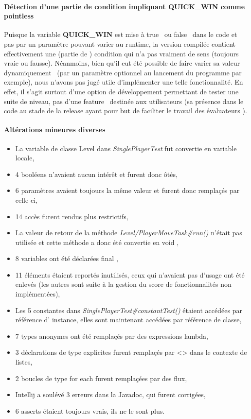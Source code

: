 \documentclass[12pt, openany]{report}
\begin{document}
\paragraph{Détection d'une partie de condition impliquant QUICK\_WIN comme \og pointless \fg} 
Puisque la variable \textbf{QUICK\_WIN} est mise à \og true \fg \, ou \og false \fg \, dans le code et pas par un paramètre pouvant varier au runtime, la version compilée contient effectivement une (partie de ) condition qui n'a pas vraiment de sens (toujours vraie ou fausse).
Néanmoins, bien qu'il eut été possible de faire varier sa valeur \og dynamiquement \fg \, (par un paramètre optionnel au lancement du programme par exemple), nous n'avons pas jugé utile d'implémenter une telle fonctionnalité. En effet, il s'agit surtout d'une option de développement permettant de tester une suite de niveau, pas d'une \og feature \fg \, destinée aux utilisateurs (sa présence dans le code au stade de la release ayant pour but de faciliter le travail des \og évaluateurs \fg).
\paragraph{Altérations mineures diverses}

\begin{itemize}
	\item La variable de classe \og Level \fg{} dans \mbox{\textit{SinglePlayerTest}} fut convertie en variable locale,
	\item 4 booléens n'avaient aucun intérêt et furent donc ôtés,
	\item 6 paramètres avaient toujours la même valeur et furent donc remplaçés par celle-ci,
	\item 14 accès furent rendus plus restrictifs,
	\item La valeur de retour de la méthode \mbox{\textit{Level/PlayerMoveTask\#run()}} n'était pas utilisée et cette méthode a donc été convertie en \og void \fg{},
	\item 8 variables ont été déclarées \og final \fg{},
	\item 11 éléments étaient reportés inutilisés, ceux qui n'avaient pas d'usage ont été enlevés (les autres sont suite à la gestion du score de fonctionnalités non implémentées),
	\item Les 5 constantes dans \mbox{\textit{SinglePlayerTest\#constantTest()}} étaient accédées par référence d' instance, elles sont maintenant accédées par référence de classe, 
	\item 7 types anonymes ont été remplaçés par des expressions lambda,
	\item 3 déclarations de type explicites furent remplaçés par \og <> \fg{} dans le contexte de listes,
	\item 2 boucles de type \og for each \fg{} furent remplaçées par des flux,
	\item Intellij a soulévé 3 erreurs dans la Javadoc, qui furent corrigées,
	\item 6 \og asserts \fg{} étaient toujours vrais, ils ne le sont plus.
\end{itemize}
\end{document}
